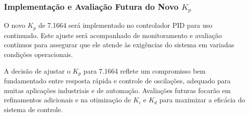 \subsubsection{Implementação e Avaliação Futura do Novo \( K_p \)}
O novo \( K_p \) de 7.1664 será implementado no controlador PID para uso continuado. Este ajuste será acompanhado de monitoramento e avaliação contínuos para assegurar que ele atende às exigências do sistema em variadas condições operacionais.

A decisão de ajustar o \( K_p \) para 7.1664 reflete um compromisso bem fundamentado entre resposta rápida e controle de oscilações, adequado para muitas aplicações industriais e de automação. Avaliações futuras focarão em refinamentos adicionais e na otimização de \( K_i \) e \( K_d \) para maximizar a eficácia do sistema de controle.
